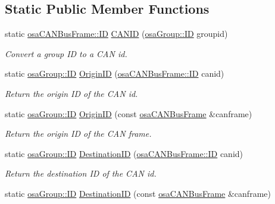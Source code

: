\subsection*{Static Public Member Functions}
\begin{DoxyCompactItemize}
\item 
static \hyperlink{classosa_c_a_n_bus_frame_ae917bcfe6427b2055a405716909c6048}{osa\+C\+A\+N\+Bus\+Frame\+::\+I\+D} \hyperlink{classosa_group_a332607860406b46ce4b1643ffa243fdd}{C\+A\+N\+I\+D} (\hyperlink{classosa_group_a642da327f9e3c40d46293432b949f199}{osa\+Group\+::\+I\+D} groupid)
\begin{DoxyCompactList}\small\item\em Convert a group I\+D to a C\+A\+N id. \end{DoxyCompactList}\item 
static \hyperlink{classosa_group_a642da327f9e3c40d46293432b949f199}{osa\+Group\+::\+I\+D} \hyperlink{classosa_group_a292f6b5dbb394ca983a86b051029f0d8}{Origin\+I\+D} (\hyperlink{classosa_c_a_n_bus_frame_ae917bcfe6427b2055a405716909c6048}{osa\+C\+A\+N\+Bus\+Frame\+::\+I\+D} canid)
\begin{DoxyCompactList}\small\item\em Return the origin I\+D of the C\+A\+N id. \end{DoxyCompactList}\item 
static \hyperlink{classosa_group_a642da327f9e3c40d46293432b949f199}{osa\+Group\+::\+I\+D} \hyperlink{classosa_group_afe8c7c42b72a0ed95915a1fb91e705b8}{Origin\+I\+D} (const \hyperlink{classosa_c_a_n_bus_frame}{osa\+C\+A\+N\+Bus\+Frame} \&canframe)
\begin{DoxyCompactList}\small\item\em Return the origin I\+D of the C\+A\+N frame. \end{DoxyCompactList}\item 
static \hyperlink{classosa_group_a642da327f9e3c40d46293432b949f199}{osa\+Group\+::\+I\+D} \hyperlink{classosa_group_a35e576c3f6070b42ed376e53b1c57c4a}{Destination\+I\+D} (\hyperlink{classosa_c_a_n_bus_frame_ae917bcfe6427b2055a405716909c6048}{osa\+C\+A\+N\+Bus\+Frame\+::\+I\+D} canid)
\begin{DoxyCompactList}\small\item\em Return the destination I\+D of the C\+A\+N id. \end{DoxyCompactList}\item 
static \hyperlink{classosa_group_a642da327f9e3c40d46293432b949f199}{osa\+Group\+::\+I\+D} \hyperlink{classosa_group_ae58af2b24319bd8e046b5b83c1c7eab5}{Destination\+I\+D} (const \hyperlink{classosa_c_a_n_bus_frame}{osa\+C\+A\+N\+Bus\+Frame} \&canframe)

\end{DoxyCompactItemize}
